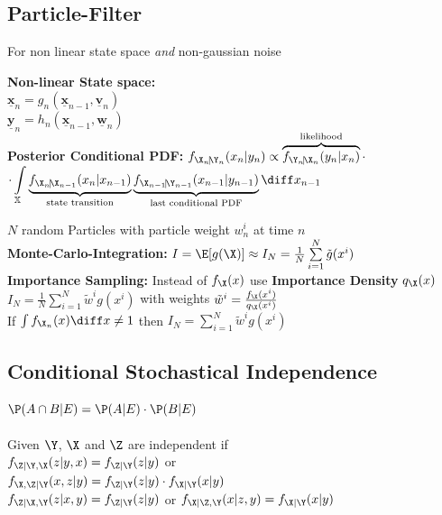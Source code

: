 \documentclass[english]{latex4ei/latex4ei_sheet}
\renewcommand{\vec}[1]{\underline{\boldsymbol{#1}}}
\begin{document}
\begin{sectionbox}
	\subsection{Particle-Filter}
	For non linear state space \emph{and} non-gaussian noise

	\textbf{Non-linear State space:}\\
	$\vec x_n = g_n(\vec x_{n−1}, \vec v_n)$\\
	$\vec y_n = h_n(\vec x_{n−1}, \vec w_n)$\\


	\textbf{Posterior Conditional PDF:} $f_{\X_n\!|\!\Y_n}(x_n|y_n) \propto \overbrace{ f_{\Y_n\!|\!\X_n}(y_n|x_n) }^{\text{likelihood}} \cdot$\\
	${ \displaystyle \cdot \int\limits_{\mathbb X} \underbrace{ f_{\X_n\!|\!\X_{n-1}}(x_n|x_{n-1}) }_{\text{state transition}} \underbrace{ f_{\X_{n-1}\!|\!\Y_{n-1}}(x_{n-1}|y_{n-1}) }_{\text{last conditional PDF}} \diff x_{n-1} }$


	$N$ random Particles with particle weight $w_n^i$ at time $n$\\
	\textbf{Monte-Carlo-Integration:} 
	$I = \E[g(\X)] \approx I_N = \frac{1}{N} \sum\limits_{i=1}^{N} \tilde g(x^i)$\\
	\textbf{Importance Sampling:} Instead of $f_{\X}(x)$ use \textbf{Importance Density} $q_{\X}(x)$\\
	$I_N = \frac{1}{N} \sum\limits_{i=1}^{N} \tilde w^i g(x^i)$ with weights $\tilde w^i = \frac{f_{\X}(x^i)}{q_{\X}(x^i)}$\\
	If $\int f_{\X_n}(x) \diff x \ne 1$ then $I_N = \sum\limits_{i=1}^{N} \tilde w^i g(x^i)$\\
\end{sectionbox}

\begin{sectionbox}
	\subsection{Conditional Stochastical Independence}
	$\P(A \cap B | E) = \P(A | E) \cdot \P(B | E)$\\
	\\
	Given $\Y$, $\X$ and $\Z$ are independent if\\
	$f_{\Z|\Y,\X} (z | y, x) = f_{\Z|\Y}(z|y)$ or\\
	$f_{\X,\Z|\Y} (x,z|y) = f_{\Z|\Y}(z|y) \cdot f_{\X|\Y}(x|y)$\\
	$f_{\Z|\X,\Y}(z|x,y) = f_{\Z|\Y}(z|y)$ or $f_{\X|\Z,\Y}(x|z,y) = f_{\X|\Y}(x|y)$

	
	
\end{sectionbox}
\end{document}
